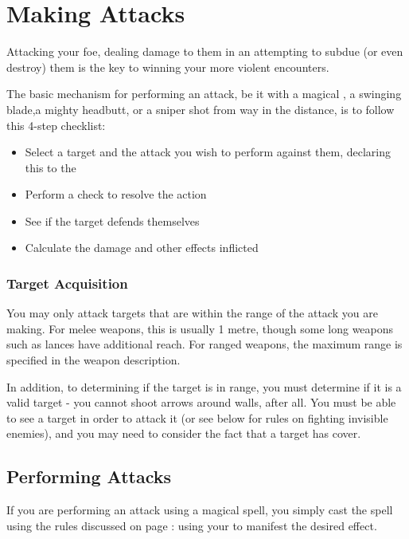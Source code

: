 
\chapter{Making Attacks}\label{S:Attacks} 

Attacking your foe, dealing damage to them in an attempting to subdue (or even destroy) them is the key to winning your more violent encounters. 

The basic mechanism for performing an attack, be it with a magical , a swinging blade,a mighty headbutt, or a sniper shot from way in the distance, is to follow this 4-step checklist:

\begin{itemize}
	\item Select a target and the attack you wish to perform against them, declaring this to the 
	\item Perform a check to resolve the action 
	\item See if the target defends themselves
	\item Calculate the damage and other effects inflicted
\end{itemize}

\subsection{Target Acquisition}

You may only attack targets that are within the range of the attack you are making. For melee weapons, this is usually 1 metre, though some long weapons such as lances have additional reach. For ranged weapons, the maximum range is specified in the weapon description. 

In addition, to determining if the target is in range, you must determine if it is a valid target - you cannot shoot arrows around walls, after all. You must be able to see a target in order to attack it (or see below for rules on fighting invisible enemies), and you may need to consider the fact that a target has cover. 

\section{Performing Attacks}

If you are performing an attack using a magical spell, you simply cast the spell using the rules discussed on page \pageref{S:CastingChecks}: using your  to manifest the desired effect. 

